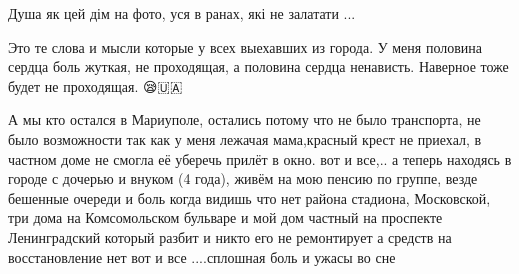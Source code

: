 Душа як цей дім на фото, уся в ранах, які не залатати ...


Это те слова и мысли которые у всех выехавших из города. У меня половина сердца
боль жуткая, не проходящая, а половина сердца ненависть. Наверное тоже будет не
проходящая. 😪🇺🇦🙏🙏🙏


А мы кто остался в Мариуполе, остались потому что не было транспорта, не было
возможности так как у меня лежачая мама,красный крест не приехал, в частном
доме не смогла её уберечь прилёт в окно. вот и все,.. а теперь находясь в городе
с дочерью и внуком (4 года), живём на мою пенсию по группе, везде бешенные
очереди и боль когда видишь что нет района стадиона, Московской, три дома на
Комсомольском бульваре и мой дом частный на проспекте Ленинградский который
разбит и никто его не ремонтирует а средств на восстановление нет вот и все
....сплошная боль и ужасы во сне

